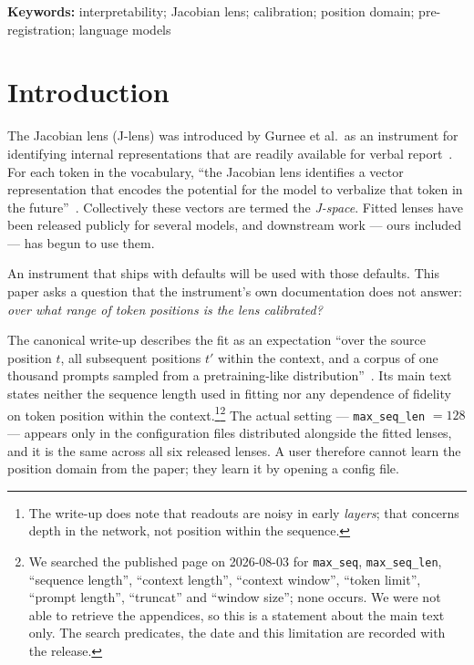 \documentclass[11pt]{article}
\begin{document}
\vspace{0.4em}
\noindent\textbf{Keywords:} interpretability; Jacobian lens; calibration;
position domain; pre-registration; language models

\section{Introduction}
\label{sec:intro}

The Jacobian lens (J-lens) was introduced by Gurnee et al.\ as an
instrument for identifying internal representations that are readily
available for verbal report~\cite{gurnee2026workspace}. For each token in
the vocabulary, ``the Jacobian lens identifies a vector representation
that encodes the potential for the model to verbalize that token in the
future''~\cite{gurnee2026workspace}. Collectively these vectors are
termed the \emph{J-space}. Fitted lenses have been released publicly for
several models, and downstream work --- ours included --- has begun to
use them.

An instrument that ships with defaults will be used with those defaults.
This paper asks a question that the instrument's own documentation does
not answer: \emph{over what range of token positions is the lens
calibrated?}

The canonical write-up describes the fit as an expectation ``over the
source position $t$, all subsequent positions $t'$ within the context,
and a corpus of one thousand prompts sampled from a pretraining-like
distribution''~\cite{gurnee2026workspace}. Its main text states neither the
sequence length used in fitting nor any dependence of fidelity on token
position within the context.\footnote{The write-up does note that readouts
are noisy in early \emph{layers}; that concerns depth in the network, not
position within the sequence.}\footnote{We searched the published page on
2026-08-03 for \texttt{max\_seq}, \texttt{max\_seq\_len}, ``sequence
length'', ``context length'', ``context window'', ``token limit'', ``prompt
length'', ``truncat'' and ``window size''; none occurs. We were not able to
retrieve the appendices, so this is a statement about the main text only. The
search predicates, the date and this limitation are recorded with the release.} The actual setting ---
\texttt{max\_seq\_len} $=128$ --- appears only in the configuration files
distributed alongside the fitted lenses, and it is the same across all
six released lenses. A user therefore cannot learn the position domain
from the paper; they learn it by opening a config file.
\end{document}
